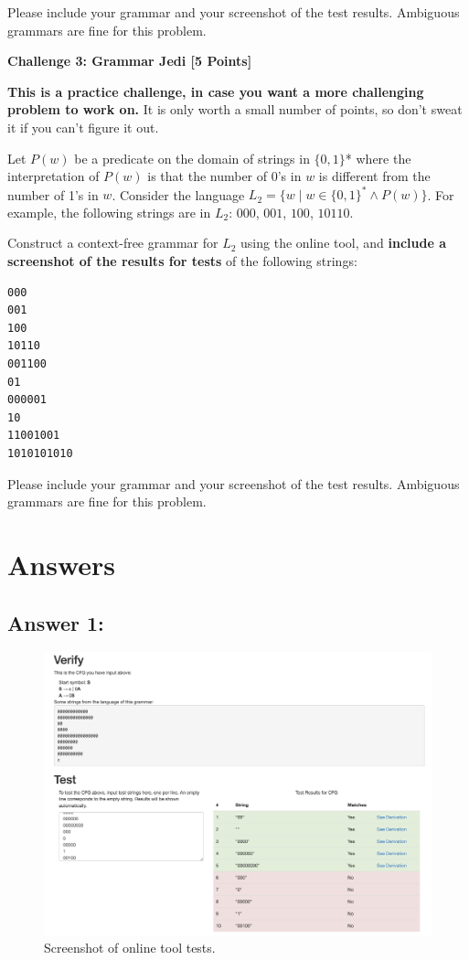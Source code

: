 \documentclass[11pt]{article}
\newcommand{\Problem}[3]{\mbox{} \newline \noindent \textbf{\textbf{Challenge #1: #2 [#3 Points] \\ }}}
\begin{document}
Please include your grammar and your screenshot of the test results. Ambiguous grammars are fine for this problem.

\Problem{3}{Grammar Jedi}{5}

\textbf{This is a practice challenge, in case you want a more challenging problem to work on.} It is only worth a small number of points, so don't sweat it if you can't figure it out.

Let $P(w)$ be a predicate on the domain of strings in $\{0, 1\}$* where the interpretation of $P(w)$ is that the number of 0's in $w$ is different from the number of 1's in $w$.
Consider the language $L_2 = \{ w \mid w \in \{0, 1\}^* \wedge P(w) \}$. For example, the following strings are in $L_2$:  $000$, $001$, $100$, $10110$.

Construct a context-free grammar for $L_2$ using the online tool, and \textbf{include a screenshot of the results for tests} of the following strings:
\begin{tcolorbox}
\begin{verbatim}
000
001
100
10110
001100
01
000001
10
11001001
1010101010
\end{verbatim}
\end{tcolorbox}

Please include your grammar and your screenshot of the test results. Ambiguous grammars are fine for this problem.
\newpage
\section*{Answers}
\subsection*{Answer 1:}
\begin{figure}[htbp!]
    \centering
    \includegraphics[width=0.9\linewidth]{hw8ss1.png}
    \caption{Screenshot of online tool tests.}
    \label{screenshot}
\end{figure}
\end{document}
